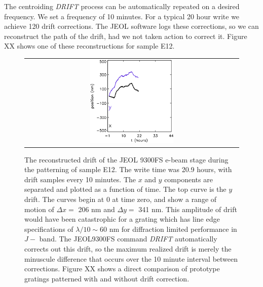 \documentclass[]{spie}  %
\begin{document}
The centroiding \emph{DRIFT} process can be automatically repeated on a desired frequency.  We set a frequency of 10 minutes.  For a typical 20 hour write we achieve 120 drift corrections.  The JEOL software logs these corrections, so we can reconstruct the path of the drift, had we not taken action to correct it.  Figure XX shows one of these reconstructions for sample E12.

\begin{figure}
\begin{center}
 \begin{tabular}{c}
    \includegraphics[width=0.4\textwidth]{figs/E12_drift_ebeam.png}
   \end{tabular}
  \end{center}
  \caption[Drift amplitude]{\label{fig:ebeamDrift} The reconstructed drift of the JEOL 9300FS e-beam stage during the patterning of sample E12.  The write time was 20.9 hours, with drift samples every 10 minutes.  The $x$ and $y$ components are separated and plotted as a function of time.  The top curve is the $y$ drift.  The curves begin at 0 at time zero, and show a range of motion of $\Delta x = $ 206 nm and $\Delta y = $ 341 nm.  This amplitude of drift would have been catastrophic for a grating which has line edge specifications of $\lambda/10 \sim 60 $ nm for diffraction limited performance in $J-$ band.  The JEOL9300FS command \emph{DRIFT} automatically corrects out this drift, so the maximum realized drift is merely the minuscule difference that occurs over the 10 minute interval between corrections.  Figure XX shows a direct comparison of prototype gratings patterned with and without drift correction.  }
\end{figure}
\end{document}
